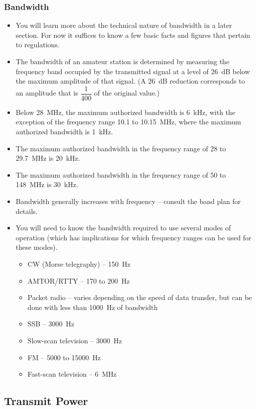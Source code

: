 \documentclass[letterpaper,12pt]{scrartcl}
\begin{document}
\subsubsection{Bandwidth}

\begin{itemize}
\item You will learn more about the technical nature of bandwidth in a later section. For now it suffices to know a few basic facts and figures that pertain to regulations.
\item The bandwidth of an amateur station is determined by measuring the frequency band occupied by the transmitted signal at a level of 26~dB below the maximum amplitude of that signal.
(A 26~dB reduction corresponds to an amplitude that is $\dfrac{1}{400}$ of the original value.)
\item Below 28~MHz, the maximum authorized bandwidth is 6~kHz, with the exception of the frequency range 10.1 to 10.15~MHz, where the maximum authorized bandwidth is 1~kHz.
\item The maximum authorized bandwidth in the frequency range of 28 to 29.7~MHz is 20~kHz.
\item The maximum authorized bandwidth in the frequency range of 50 to 148~MHz is 30~kHz.
\item Bandwidth generally increases with frequency -- consult the band plan for details.
\item You will need to know the bandwidth required to use several modes of operation (which has implications for which frequency ranges can be used for these modes).
\begin{itemize}
\item CW (Morse telegraphy) -- 150~Hz
\item AMTOR/RTTY -- 170 to 200~Hz
\item Packet radio -- varies depending on the speed of data transfer, but can be done with less than 1000~Hz of bandwidth
\item SSB -- 3000~Hz
\item Slow-scan television -- 3000~Hz
\item FM -- 5000 to 15000~Hz
\item Fast-scan television -- 6~MHz
\end{itemize}
\end{itemize}

\subsection{Transmit Power}
\end{document}
